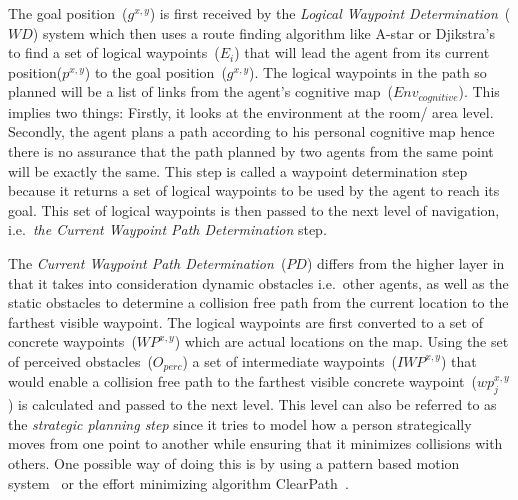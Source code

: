 The goal position~($g^{x,y}$) is first received by the \emph{Logical Waypoint Determination}~($WD$) system which then uses a route finding algorithm like A-star or Djikstra's~\cite{Russel:1995wca} to find a set of logical waypoints~($E_i$) that will lead the agent from its current position($p^{x,y}$) to the goal position~($g^{x,y}$). The logical waypoints in the path so planned will be a list of links from the agent's cognitive map~($Env_{cognitive}$). This implies two things: Firstly, it looks at the environment at the room/ area level. Secondly, the agent plans a path according to his personal cognitive map hence there is no assurance that the path planned by two agents from the same point will be exactly the same. This step is called a waypoint determination step because it returns a set of logical waypoints to be used by the agent to reach its goal. This set of logical waypoints is then passed to the next level of navigation, i.e.\ \emph{the Current Waypoint Path Determination} step.

The \emph{Current Waypoint Path Determination}~($PD$) differs from the higher layer in that it takes into consideration dynamic obstacles i.e.\ other agents, as well as the static obstacles to determine a collision free path from the current location to the farthest visible waypoint. The logical waypoints are first converted to a set of concrete waypoints~($WP^{x,y}$) which are actual locations on the map. Using the set of perceived obstacles~($O_{perc}$) a set of intermediate waypoints~($IWP^{x,y}$) that would enable a collision free path to the farthest visible concrete waypoint~($wp^{x,y}_j$) is calculated and passed to the next level. This level can also be referred to as the \emph{strategic planning step} since it tries to model how a person strategically moves from one point to another while ensuring that it minimizes collisions with others. One possible way of doing this is by using a pattern based motion system~\cite{Nan:2011vr} or the effort minimizing algorithm ClearPath~\cite{Guy:2009gu}.

